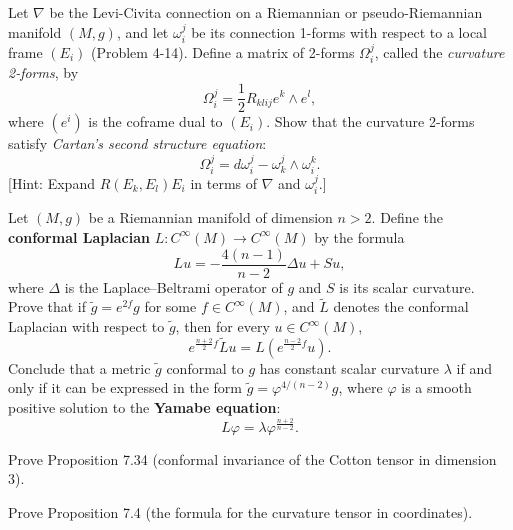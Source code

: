 \begin{exercise}
\label{prob:cartan-second-structure-equation}
Let $\nabla$ be the Levi-Civita connection on a Riemannian or pseudo-Riemannian manifold $(M,g)$, and let $\omega_i^j$ be its connection 1-forms with respect to a local frame $(E_i)$ (Problem 4-14). Define a matrix of 2-forms $\Omega_i^j$, called the \textit{curvature 2-forms}, by
\[
\Omega_i^j = \frac{1}{2}R_{klij} e^k \wedge e^l,
\]
where $(e^i)$ is the coframe dual to $(E_i)$. Show that the curvature 2-forms satisfy \textit{Cartan's second structure equation}:
\[
\Omega_i^j = d\omega_i^j - \omega_k^j \wedge \omega_i^k.
\]
[Hint: Expand $R(E_k, E_l)E_i$ in terms of $\nabla$ and $\omega_i^j$.]
\end{exercise}

\begin{exercise}
\label{prob:conformal-laplacian-yamabe}
Let $(M, g)$ be a Riemannian manifold of dimension $n > 2$. Define the \textbf{conformal Laplacian} $L: C^\infty(M) \to C^\infty(M)$ by the formula
\[
Lu = -\frac{4(n-1)}{n-2} \Delta u + Su,
\]
where $\Delta$ is the Laplace--Beltrami operator of $g$ and $S$ is its scalar curvature. Prove that if $\tilde{g} = e^{2f} g$ for some $f \in C^\infty(M)$, and $\tilde{L}$ denotes the conformal Laplacian with respect to $\tilde{g}$, then for every $u \in C^\infty(M)$,
\[
e^{\frac{n+2}{2}f} \tilde{L}u = L\left(e^{\frac{n-2}{2}f} u\right).
\]
Conclude that a metric $\tilde{g}$ conformal to $g$ has constant scalar curvature $\lambda$ if and only if it can be expressed in the form $\tilde{g} = \varphi^{4/(n-2)} g$, where $\varphi$ is a smooth positive solution to the \textbf{Yamabe equation}:
\begin{equation}
L\varphi = \lambda \varphi^{\frac{n+2}{n-2}}.
\tag{7.59}
\end{equation}
\end{exercise}

\begin{exercise}
\label{prob:cotton-tensor-conformal}
Prove Proposition 7.34 (conformal invariance of the Cotton tensor in dimension 3).
\end{exercise}

\begin{exercise}
\label{prob:curvature-coordinate-formula}
Prove Proposition 7.4 (the formula for the curvature tensor in coordinates).
\end{exercise}

